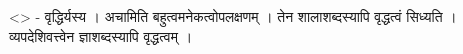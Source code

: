 \textless{}\textgreater{} - वृद्धिर्यस्य । अचामिति
बहुत्वमनेकत्वोपलक्षणम् । तेन शालाशब्दस्यापि वृद्धत्वं सिध्यति ।
व्यपदेशिवत्त्वेन ज्ञाशब्दस्यापि वृद्धत्वम् ।
